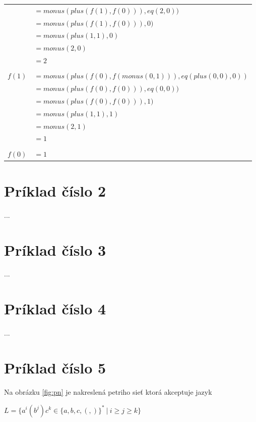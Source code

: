 \documentclass[11pt,a4paper]{article}
\begin{document}
\begin{tabular}{rl}
                    & $= monus(plus(f(1),f(0))),eq(2,0))$\\
                    & $= monus(plus(f(1),f(0))),0)$\\
                    & $= monus(plus(1,1),0)$\\
                    & $= monus(2,0)$\\
                    & $= 2$\\
\\[-0.5em]
$f(1)$\hspace{-3mm} & $= monus(plus(f(0),f(monus(0,1))),eq(plus(0,0),0))$\\
                    & $= monus(plus(f(0),f(0))),eq(0,0))$\\
                    & $= monus(plus(f(0),f(0))),1)$\\
                    & $= monus(plus(1,1),1)$\\
                    & $= monus(2,1)$\\
                    & $= 1$\\
\\[-0.5em]
$f(0)$\hspace{-3mm} & $= 1$\\
\end{tabular}

\newpage
\section{Príklad číslo 2}

...\cite{TIN}

\newpage
\section{Príklad číslo 3}

...

\newpage
\section{Príklad číslo 4}

...

\newpage
\section{Príklad číslo 5}

Na obrázku \ref{fig:pn} je nakreslená petriho sieť ktorá akceptuje jazyk

\begin{center}
$L = \{a^i(b^j)c^k \in \{a,b,c,(,)\}^* \ | \ i \geq j \geq k\}$
\end{center}
\end{document}
